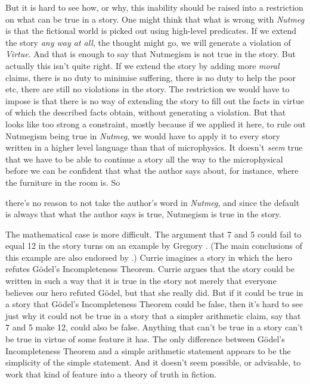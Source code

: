 {But it is hard to see how, or why, this inability should be raised into a restriction on what can be true in a story. One might think that what is wrong with \textit{Nutmeg }is that the fictional world is picked out using high-level predicates. If we extend the story \textit{any way at all}, the thought might go, we will generate a violation of \textit{Virtue}. And that is enough to say that Nutmegism is not true in the story. But actually this isn't quite right. If we extend the story by adding more \textit{moral }claims, there is no duty to minimise suffering, there is no duty to help the poor etc, there are still no violations in the story. The restriction we would have to impose is that there is no way of extending the story to fill out the facts in virtue of which the described facts obtain, without generating a violation. But that looks like too strong a constraint, mostly because if we applied it here, to rule out Nutmegism being true in \textit{Nutmeg}, we would have to apply it to every story written in a higher level language than that of microphysics. It doesn't \textit{seem }true that we have to be able to continue a story all the way to the microphysical before we can be confident that what the author says about, for instance, where the furniture in the room is. So {there's no reason to not take the author's word in \textit{Nutmeg}, and since the default is always that what the author says is true, Nutmegism is true in the story.

The mathematical case is more difficult. The argument that 7 and 5 could fail to equal 12 in the story turns on an example by Gregory \citet{Currie1990}. (The main conclusions of this example are also endorsed by \citet{Byrne1993}.) Currie imagines a story in which the hero refutes G\"odel's Incompleteness Theorem. Currie argues that the story could be written in such a way that it is true in the story not merely that everyone believes our hero refuted G\"odel, but that she really did. But if it could be true in a story that G\"odel's Incompleteness Theorem could be false, then it's hard to see just why it could not be true in a story that a simpler arithmetic claim, say that 7 and 5 make 12, could also be false. Anything that can't be true in a story can't be true in virtue of some feature it has. The only difference between G\"odel's Incompleteness Theorem and a simple arithmetic statement appears to be the simplicity of the simple statement. And it doesn't seem possible, or advisable, to work that kind of feature into a theory of truth in fiction.

}}
